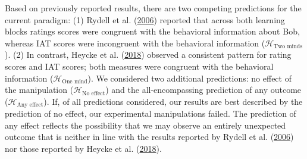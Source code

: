 \documentclass[
  man,floatsintext]{apa6}
\begin{document}
Based on previously reported results, there are two competing predictions for the current paradigm:
(1) Rydell et al. (\protect\hyperlink{ref-rydell_two_2006}{2006}) reported that across both learning blocks ratings scores were congruent with the behavioral information about Bob, whereas IAT scores were incongruent with the behavioral information (\(\mathcal{H}_\textrm{Two minds}\)).
(2) In contrast, Heycke et al. (\protect\hyperlink{ref-heycke_two_2018}{2018}) observed a consistent pattern for rating scores and IAT scores; both measures were congruent with the behavioral information (\(\mathcal{H}_\textrm{One mind}\)).
We considered two additional predictions: no effect of the manipulation (\(\mathcal{H}_\textrm{No effect}\)) and the all-encompassing prediction of any outcome (\(\mathcal{H}_\textrm{Any effect}\)).
If, of all predictions considered, our results are best described by the prediction of no effect, our experimental manipulations failed.
The prediction of any effect reflects the possibility that we may observe an entirely unexpected outcome that is neither in line with the results reported by Rydell et al. (\protect\hyperlink{ref-rydell_two_2006}{2006}) nor those reported by Heycke et al. (\protect\hyperlink{ref-heycke_two_2018}{2018}).
\end{document}

